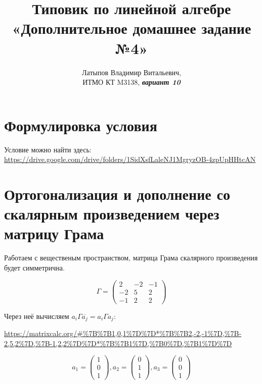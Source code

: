 \documentclass[12pt, a4paper]{article}
\author{Латыпов Владимир Витальевич, \\ ИТМО КТ M3138, \Huge{\textit{\textbf{вариант 10}}}}
\title{Типовик по линейной алгебре «Дополнительное домашнее задание №4»}
\begin{document}
    \tit

    \section{Формулировка условия}

    \begin{statement}
        Условие можно найти здесь: \url{https://drive.google.com/drive/folders/1SidXsfLaleNJ1MgryzOB-4zpUpHHtcAN}
    \end{statement}

    \section{Ортогонализация и дополнение со скалярным произведением через матрицу Грама}

    Работаем с вещественым пространством, матрица Грама скалярного произведения будет симметрична.

    \begin{equation}
        \Gamma = \left(\begin{matrix}
            2 & -2 & -1 \\
            -2 & 5 & 2 \\
            -1 & 2 & 2
        \end{matrix}\right)
    \end{equation}

    Через неё вычисляем $a_i \Gamma \overline{a_j} = a_i \Gamma a_j$:

    \url{https://matrixcalc.org/#%7B%7B1,0,1%7D%7D*%7B%7B2,-2,-1%7D,%7B-2,5,2%7D,%7B-1,2,2%7D%7D*%7B%7B1%7D,%7B0%7D,%7B1%7D%7D}

    \begin{equation}
        a_1 = \begin{pmatrix}
            1 \\ 0 \\ 1
        \end{pmatrix},
        a_2 = \begin{pmatrix}
            0\\1\\1
        \end{pmatrix},
        a_3 = \begin{pmatrix}
            0\\0\\1
        \end{pmatrix}
    \end{equation}
\end{document}
